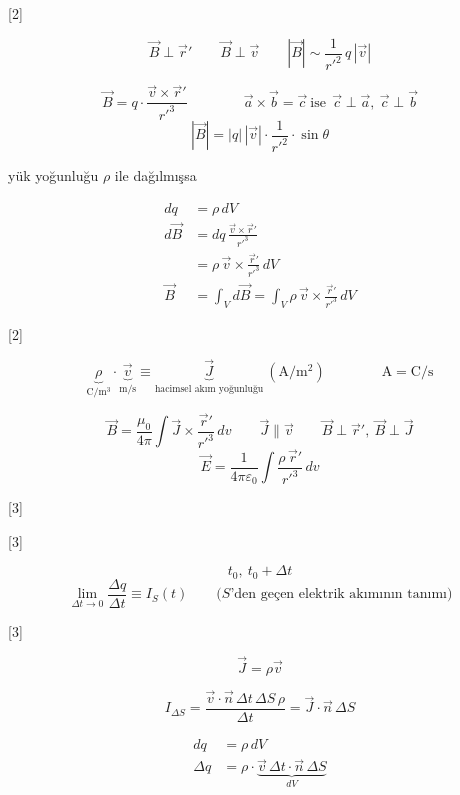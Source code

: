 \documentclass[11pt,a4paper]{article}
\begin{document}
[2]

\[ \vec{B}\perp\vec{r}' \qquad \vec{B}\perp\vec{v} \qquad |\vec{B}| \sim \frac{1}{r'^2}\,q\,|\vec{v}| \]

\[ \vec{B} = q\cdot\frac{\vec{v}\times\vec{r}'}{r'^3} \qquad\qquad \vec{a}\times\vec{b} = \vec{c}\ \text{ise}\ \ \vec{c}\perp\vec{a},\ \vec{c}\perp\vec{b} \]
\[ |\vec{B}| = |q|\,|\vec{v}|\cdot\frac{1}{r'^2}\cdot\sin\theta \]

\noindent yük yoğunluğu $\rho$ ile dağılmışsa

\begin{align*}
  dq &= \rho\, dV \\
  d\vec{B} &= dq\,\frac{\vec{v}\times\vec{r}'}{r'^3} \\
  &= \rho\,\vec{v}\times\frac{\vec{r}'}{r'^3}\, dV \\
  \vec{B} &= \int_V d\vec{B} = \int_V \rho\,\vec{v}\times\frac{\vec{r}'}{r'^3}\, dV
\end{align*}

[2]

\[ \underbrace{\rho}_{\mathrm{C/m^3}}\cdot\underbrace{\vec{v}}_{\mathrm{m/s}} \equiv \underbrace{\vec{J}}_{\text{hacimsel akım yoğunluğu}}\ (\mathrm{A/m^2}) \qquad\qquad \mathrm{A} = \mathrm{C/s} \]

\[ \vec{B} = \frac{\mu_0}{4\pi}\int \vec{J}\times\frac{\vec{r}'}{r'^3}\, dv \qquad \vec{J}\parallel\vec{v} \qquad \vec{B}\perp\vec{r}',\ \vec{B}\perp\vec{J} \]
\[ \vec{E} = \frac{1}{4\pi\varepsilon_0}\int \frac{\rho\,\vec{r}'}{r'^3}\, dv \]

[3]

[3]

\[ t_0,\ t_0 + \Delta t \]
\[ \lim_{\Delta t\to 0}\frac{\Delta q}{\Delta t} \equiv I_S(t) \qquad \text{($S$'den geçen elektrik akımının tanımı)} \]

[3]

\[ \vec{J} = \rho\vec{v} \]

\[ I_{\Delta S} = \frac{\vec{v}\cdot\vec{n}\,\Delta t\,\Delta S\,\rho}{\Delta t} = \vec{J}\cdot\vec{n}\,\Delta S \]

\begin{align*}
  dq &= \rho\, dV \\
  \Delta q &= \rho\cdot\underbrace{\vec{v}\,\Delta t\cdot\vec{n}\,\Delta S}_{dV}
\end{align*}
\end{document}

